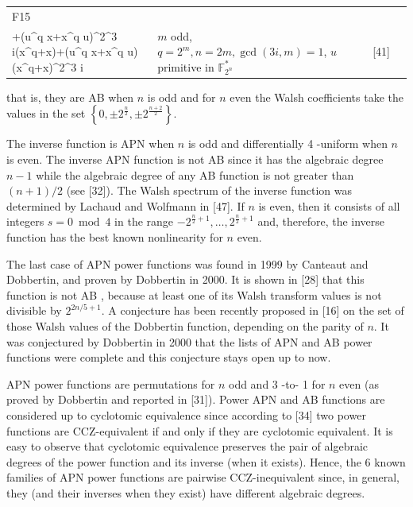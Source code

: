 \documentclass[10pt]{article}
\begin{document}
\begin{table}[h]
\begin{center}
\begin{tabular}{|l|l|l|l|}
\hline
F15 & \( \begin{gathered} u\left[\left(u^{q} x+x^{q} u\right)^{2^{2}+1}+\left(u^{q} x+x^{q} u\right)\left(x^{q}+x\right)^{2^{2}}+\left(x^{q}+x\right)^{2^{2}+1}\right] \\ +\left(u^{q} x+x^{q} u\right)^{2^{3 i}}\left(x^{q}+x\right)+\left(u^{q} x+x^{q} u\right)\left(x^{q}+x\right)^{2^{3 i}} \end{gathered} \) & $m$ odd, $q=2^{m}, n=2 m, \operatorname{gcd}(3 i, m)=1$, $u$ primitive in $\mathbb{F}_{2^{n}}^{*}$ & [41] \\
\hline
\end{tabular}
\end{center}
\end{table}

that is, they are AB when $n$ is odd and for $n$ even the Walsh coefficients take the values in the set $\left\{0, \pm 2^{\frac{n}{2}}, \pm 2^{\frac{n+2}{2}}\right\}$.

The inverse function is APN when $n$ is odd and differentially 4 -uniform when $n$ is even. The inverse APN function is not AB since it has the algebraic degree $n-1$ while the algebraic degree of any AB function is not greater than $(n+1) / 2$ (see [32]). The Walsh spectrum of the inverse function was determined by Lachaud and Wolfmann in [47]. If $n$ is even, then it consists of all integers $s=0 \bmod 4$ in the range $-2^{\frac{n}{2}+1}, \ldots, 2^{\frac{n}{2}+1}$ and, therefore, the inverse function has the best known nonlinearity for $n$ even.

The last case of APN power functions was found in 1999 by Canteaut and Dobbertin, and proven by Dobbertin in 2000. It is shown in [28] that this function is not AB , because at least one of its Walsh transform values is not divisible by $2^{2 n / 5+1}$. A conjecture has been recently proposed in [16] on the set of those Walsh values of the Dobbertin function, depending on the parity of $n$. It was conjectured by Dobbertin in 2000 that the lists of APN and AB power functions were complete and this conjecture stays open up to now.

APN power functions are permutations for $n$ odd and 3 -to- 1 for $n$ even (as proved by Dobbertin and reported in [31]). Power APN and AB functions are considered up to cyclotomic equivalence since according to [34] two power functions are CCZ-equivalent if and only if they are cyclotomic equivalent. It is easy to observe that cyclotomic equivalence preserves the pair of algebraic degrees of the power function and its inverse (when it exists). Hence, the 6 known families of APN power functions are pairwise CCZ-inequivalent since, in general, they (and their inverses when they exist) have different algebraic degrees.
\end{document}
